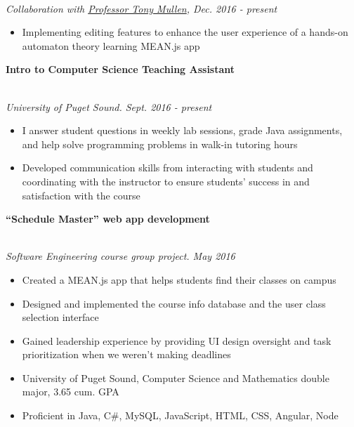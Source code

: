 \documentclass[11pt]{article}
\newcommand\phv{\fontfamily{phv}\selectfont}
\begin{document}
\\\emph{Collaboration with \textcolor{blue}{\href{http://mathcs.pugetsound.edu/~tmullen/}{Professor Tony Mullen}}, Dec. 2016 - present}
\begin{itemize}
\item Implementing editing features to enhance the user experience of a hands-on automaton theory learning MEAN.js app
\end{itemize}
\noindent \centerline{\large \bf Intro to Computer Science Teaching Assistant \hfill }
\\\emph{University of Puget Sound. Sept. 2016 - present}
\begin{itemize}
  \item I answer student questions in weekly lab sessions, grade Java assignments, and help solve programming problems in walk-in tutoring hours
  \item Developed communication skills from interacting with students and coordinating with the instructor to ensure students' success in and satisfaction with the course
\end{itemize}

\noindent \centerline{\large \bf ``Schedule Master'' web app development \hfill }
\\\emph{Software Engineering course group project. May 2016}
\begin{itemize}
  \item Created a MEAN.js app that helps students find their classes on campus
  \item Designed and implemented the course info database and the user class selection interface
  \item Gained leadership experience by providing UI design oversight and task prioritization when we weren't making deadlines
\end{itemize}
\noindent{\LARGE \bf \phv{Education \& Technology}  }
\begin{itemize}
  \item University of Puget Sound, Computer Science and Mathematics double major, 3.65 cum. GPA
  \item Proficient in Java, C\#, MySQL, JavaScript, HTML, CSS, Angular, Node
\end{itemize}
\end{document}
